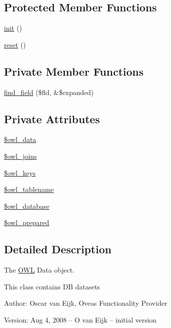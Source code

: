 \subsection*{Protected Member Functions}
\begin{CompactItemize}
\item 
\hyperlink{class__OWL_e0ef3ded56e8a6b34b6461e5a721cd3e}{init} ()
\item 
\hyperlink{class__OWL_2f2a042bcf31965194c03033df0edc9b}{reset} ()
\end{CompactItemize}
\subsection*{Private Member Functions}
\begin{CompactItemize}
\item 
\hyperlink{classDataHandler_1e4789e22370c96ae479bc3a58f30984}{find\_\-field} (\$fld, \&\$expanded)
\end{CompactItemize}
\subsection*{Private Attributes}
\begin{CompactItemize}
\item 
\hyperlink{classDataHandler_329b5524c379e0db6c4d5ce59f3c414f}{\$owl\_\-data}
\item 
\hyperlink{classDataHandler_da9b697f81ea82d269077f9c7445791d}{\$owl\_\-joins}
\item 
\hyperlink{classDataHandler_8d398720bce975159b2d13ad7a941bc7}{\$owl\_\-keys}
\item 
\hyperlink{classDataHandler_24620784bde262bdd02227962d3b9605}{\$owl\_\-tablename}
\item 
\hyperlink{classDataHandler_3ac49aa018e0ebe4c74f5a636d455a8b}{\$owl\_\-database}
\item 
\hyperlink{classDataHandler_e6093d21291ed3ab3183e11962452928}{\$owl\_\-prepared}
\end{CompactItemize}


\subsection{Detailed Description}
The \hyperlink{classOWL}{OWL} Data object. 

This class contains DB datasets \begin{Desc}
\item[Author:]Oscar van Eijk, Oveas Functionality Provider \end{Desc}
\begin{Desc}
\item[Version:]Aug 4, 2008 -- O van Eijk -- initial version \end{Desc}


